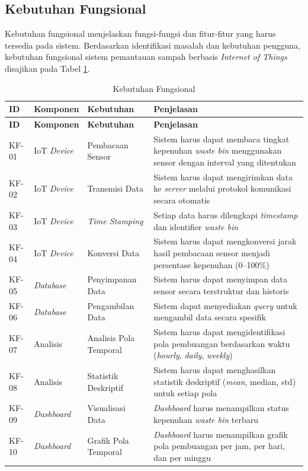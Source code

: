 \subsection{Kebutuhan Fungsional}

Kebutuhan fungsional menjelaskan fungsi-fungsi dan fitur-fitur yang harus tersedia pada sistem. Berdasarkan identifikasi masalah dan kebutuhan pengguna, kebutuhan fungsional sistem pemantauan sampah berbasis \textit{Internet of Things} disajikan pada Tabel \ref{tab:kebutuhan-fungsional}.

\begin{longtable}{| l | l | p{4cm} | p{5cm} |}
  \caption{Kebutuhan Fungsional}
  \label{tab:kebutuhan-fungsional} \\
    \hline
    \textbf{ID} & \textbf{Komponen} & \textbf{Kebutuhan} & \textbf{Penjelasan} \\
    \hline
  \endfirsthead
    \hline
    \textbf{ID} & \textbf{Komponen} & \textbf{Kebutuhan} & \textbf{Penjelasan} \\
    \hline
  \endhead
    \hline
  \endfoot
    KF-01 & IoT \textit{Device} & Pembacaan Sensor & Sistem harus dapat membaca tingkat kepenuhan \textit{waste bin} menggunakan sensor dengan interval yang ditentukan \\
    \hline
    KF-02 & IoT \textit{Device} & Transmisi Data & Sistem harus dapat mengirimkan data ke \textit{server} melalui protokol komunikasi secara otomatis \\
    \hline
    KF-03 & IoT \textit{Device} & \textit{Time Stamping} & Setiap data harus dilengkapi \textit{timestamp} dan identifier \textit{waste bin} \\
    \hline
    KF-04 & IoT \textit{Device} & Konversi Data & Sistem harus dapat mengkonversi jarak hasil pembacaan sensor menjadi persentase kepenuhan (0--100\%) \\
    \hline
    KF-05 & \textit{Database} & Penyimpanan Data & Sistem harus dapat menyimpan data sensor secara terstruktur dan historis \\
    \hline
    KF-06 & \textit{Database} & Pengambilan Data & Sistem dapat menyediakan \textit{query} untuk mengambil data secara spesifik \\
    \hline
    KF-07 & Analisis & Analisis Pola Temporal & Sistem harus dapat mengidentifikasi pola pembuangan berdasarkan waktu (\textit{hourly}, \textit{daily}, \textit{weekly}) \\
    \hline
    KF-08 & Analisis & Statistik Deskriptif & Sistem harus dapat menghasilkan statistik deskriptif (\textit{mean}, median, std) untuk setiap pola \\
    \hline
    KF-09 & \textit{Dashboard} & Visualisasi Data & \textit{Dashboard} harus menampilkan status kepenuhan \textit{waste bin} terbaru \\
    \hline
    KF-10 & \textit{Dashboard} & Grafik Pola Temporal & \textit{Dashboard} harus menampilkan grafik pola pembuangan per jam, per hari, dan per minggu \\
    \hline
\end{longtable}

